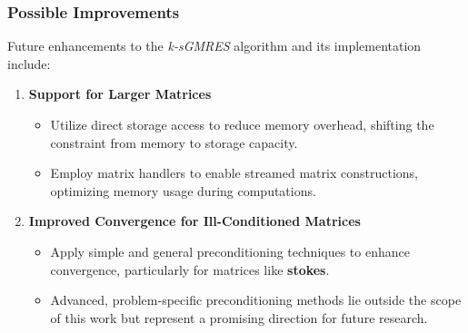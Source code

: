 \begin{frame}
    \frametitle{Possible Improvements}

    Future enhancements to the \textit{k-sGMRES} algorithm and its implementation include:

    \begin{enumerate}
        \item \textbf{Support for Larger Matrices}
        \begin{itemize}
            \item Utilize direct storage access to reduce memory overhead, shifting the constraint from memory to storage capacity.
            \item Employ matrix handlers to enable streamed matrix constructions, optimizing memory usage during computations.
        \end{itemize}
        \vspace{0.5em}

        \item \textbf{Improved Convergence for Ill-Conditioned Matrices}
        \begin{itemize}
            \item Apply simple and general preconditioning techniques to enhance convergence, particularly for matrices like \textbf{stokes}.
            \item Advanced, problem-specific preconditioning methods lie outside the scope of this work but represent a promising direction for future research.
        \end{itemize}
    \end{enumerate}

\end{frame}
